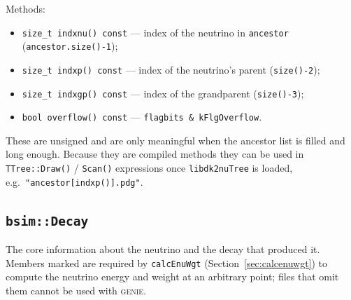 \documentclass[11pt]{article}
\newcommand{\code}[1]{\texttt{#1}}
\newcommand{\genie}{\textsc{genie}\xspace}
\newcommand{\sect}[1]{Section~\ref{sec:#1}}
\begin{document}
\noindent Methods:
\begin{itemize}[nosep]
\item \code{size\_t indxnu() const} --- index of the neutrino in
      \code{ancestor} (\code{ancestor.size()-1});
\item \code{size\_t indxp() const} --- index of the neutrino's parent
      (\code{size()-2});
\item \code{size\_t indxgp() const} --- index of the grandparent
      (\code{size()-3});
\item \code{bool overflow() const} --- \code{flagbits \& kFlgOverflow}.
\end{itemize}
These are unsigned and are only meaningful when the ancestor list is filled
and long enough.  Because they are compiled methods they can be used in
\code{TTree::Draw()} / \code{Scan()} expressions once \code{libdk2nuTree}
is loaded, e.g.\ \code{"ancestor[indxp()].pdg"}.

\subsection{\code{bsim::Decay}}\label{sec:decay}

The core information about the neutrino and the decay that produced it.
Members marked \dag{} are required by \code{calcEnuWgt}
(\sect{calcenuwgt}) to compute the neutrino energy and weight at an
arbitrary point; files that omit them cannot be used with \genie.
\end{document}
